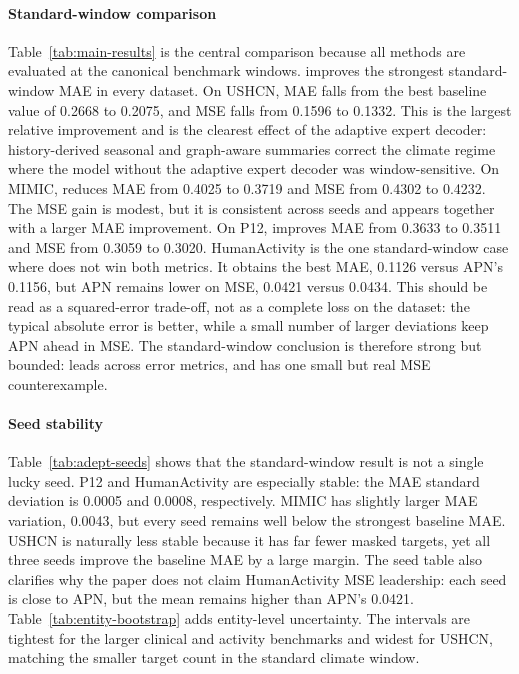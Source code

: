 \documentclass[preprint,12pt]{elsarticle}
\begin{document}
\paragraph{Standard-window comparison}
Table~\ref{tab:main-results} is the central comparison because all methods are
evaluated at the canonical benchmark windows. \method{} improves the strongest
standard-window MAE in every dataset. On USHCN, MAE falls from the best baseline
value of 0.2668 to 0.2075, and MSE falls from 0.1596 to 0.1332. This is the
largest relative improvement and is the clearest effect of the adaptive expert decoder:
history-derived seasonal and graph-aware summaries correct the climate regime
where the model without the adaptive expert decoder was window-sensitive. On MIMIC, \method{}
reduces MAE from 0.4025 to 0.3719 and MSE from 0.4302 to 0.4232. The MSE gain
is modest, but it is consistent across seeds and appears together with a larger
MAE improvement. On P12, \method{} improves MAE from 0.3633 to 0.3511 and MSE
from 0.3059 to 0.3020. HumanActivity is the one standard-window case where \method{} does not win both
metrics. It obtains the best MAE, 0.1126 versus APN's 0.1156, but APN remains
lower on MSE, 0.0421 versus 0.0434. This should be read as a squared-error
trade-off, not as a complete loss on the dataset: the typical absolute error is
better, while a small number of larger deviations keep APN ahead in MSE. The
standard-window conclusion is therefore strong but bounded: \method{} leads across error metrics, and has one small but real MSE
counterexample.

\paragraph{Seed stability}
Table~\ref{tab:adept-seeds} shows that the standard-window result is not a
single lucky seed. P12 and HumanActivity are especially stable: the MAE standard
deviation is 0.0005 and 0.0008, respectively. MIMIC has slightly larger MAE
variation, 0.0043, but every seed remains well below the strongest baseline MAE.
USHCN is naturally less stable because it has far fewer masked targets, yet all
three \method{} seeds improve the baseline MAE by a large margin. The seed table also
clarifies why the paper does not claim HumanActivity MSE leadership: each seed
is close to APN, but the mean remains higher than APN's 0.0421.
Table~\ref{tab:entity-bootstrap} adds entity-level uncertainty. The intervals
are tightest for the larger clinical and activity benchmarks and widest for
USHCN, matching the smaller target count in the standard climate window.
\end{document}
